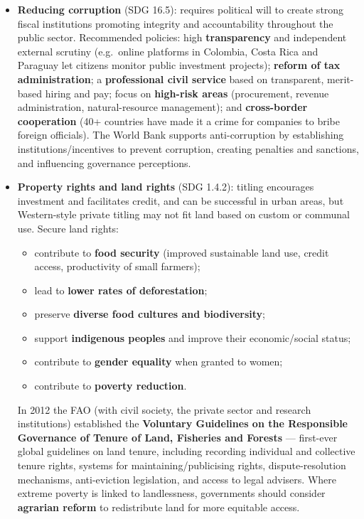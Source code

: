 \begin{itemize}
  \item \textbf{Reducing corruption} (SDG 16.5): requires political will to create strong fiscal institutions promoting integrity and accountability throughout the public sector. Recommended policies: high \textbf{transparency} and independent external scrutiny (e.g.\ online platforms in Colombia, Costa Rica and Paraguay let citizens monitor public investment projects); \textbf{reform of tax administration}; a \textbf{professional civil service} based on transparent, merit-based hiring and pay; focus on \textbf{high-risk areas} (procurement, revenue administration, natural-resource management); and \textbf{cross-border cooperation} (40+ countries have made it a crime for companies to bribe foreign officials). The World Bank supports anti-corruption by establishing institutions/incentives to prevent corruption, creating penalties and sanctions, and influencing governance perceptions.
  \item \textbf{Property rights and land rights} (SDG 1.4.2): titling encourages investment and facilitates credit, and can be successful in urban areas, but Western-style private titling may not fit land based on custom or communal use. Secure land rights:
  \begin{itemize}
    \item contribute to \textbf{food security} (improved sustainable land use, credit access, productivity of small farmers);
    \item lead to \textbf{lower rates of deforestation};
    \item preserve \textbf{diverse food cultures and biodiversity};
    \item support \textbf{indigenous peoples} and improve their economic/social status;
    \item contribute to \textbf{gender equality} when granted to women;
    \item contribute to \textbf{poverty reduction}.
  \end{itemize}
  In 2012 the FAO (with civil society, the private sector and research institutions) established the \textbf{Voluntary Guidelines on the Responsible Governance of Tenure of Land, Fisheries and Forests} --- first-ever global guidelines on land tenure, including recording individual and collective tenure rights, systems for maintaining/publicising rights, dispute-resolution mechanisms, anti-eviction legislation, and access to legal advisers. Where extreme poverty is linked to landlessness, governments should consider \textbf{agrarian reform} to redistribute land for more equitable access.
\end{itemize}

